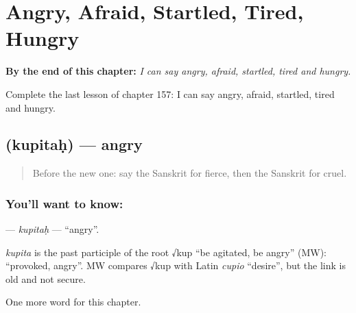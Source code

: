 
\chapter{Angry, Afraid, Startled, Tired, Hungry}
\label{ch:sa-angry-afraid-startled-tired-hungry}

\begin{chapteropening}
\textbf{By the end of this chapter:} \emph{I can say angry, afraid, startled, tired and hungry.}

Complete the last lesson of chapter 157: I can say angry, afraid, startled, tired and hungry.
\end{chapteropening}

\section[\texorpdfstring{\sk{कुपितः} (kupitaḥ)}{कुपितः (kupitaḥ)}]{ (kupitaḥ) — angry}

\label{lesson:SA-C157-kupitah}



\begin{quote}
Before the new one: say the Sanskrit for fierce, then the Sanskrit for cruel.
\end{quote}

\subsection*{You'll want to know: }
\textbf{} — \emph{kupitaḥ} — \textquotedblleft{}angry\textquotedblright{}.

\begin{cousinweb}
\emph{kupita} is the past participle of the root √kup \textquotedblleft{}be agitated, be angry\textquotedblright{} (MW): \textquotedblleft{}provoked, angry\textquotedblright{}. MW compares √kup with Latin \emph{cupio} \textquotedblleft{}desire\textquotedblright{}, but the link is old and not secure.
\end{cousinweb}

\begin{grammarlens}[title={What you've built}]
One more word for this chapter.
\end{grammarlens}

